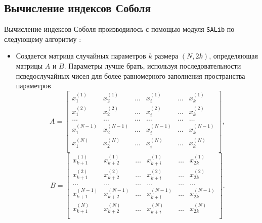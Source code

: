 \documentclass[a4paper,12pt]{article} %
\begin{document}
\subsection{Вычисление индексов Соболя}
Вычисление индексов Соболя производилось с помощью модуля \texttt{SALib} \cite{Iwanaga2022, Herman2017} по следующему алгоритму \cite{saltelli2008global}:
\begin{itemize}
\item Создается матрица случайных параметров $k$ размера $(N,2k)$, определяющая матрицы $A$ и $B$. Параметры лучше брать, используя последовательности псведослучайных чисел для более равномерного заполнения пространства параметров \cite{sobol1967distribution, sobol1976uniformly}
\begin{displaymath}
A=\begin{bmatrix}
x_1^{(1)} & x_2^{(1)} & \ldots & x_i^{(1)} & \ldots & x_k^{(1)} \\
x_1^{(2)} & x_2^{(2)} & \ldots & x_i^{(2)} & \ldots & x_k^{(2)} \\
\ldots & \ldots & \ldots & \ldots & \ldots & \ldots \\
x_1^{(N-1)} & x_2^{(N-1)} & \ldots & x_i^{(N-1)} & \ldots & x_k^{(N-1)} \\
x_1^{(N)} & x_2^{(N)} & \ldots & x_i^{(N)} & \ldots & x_k^{(N)} \\
\end{bmatrix},
\end{displaymath}
\begin{displaymath}
B=\begin{bmatrix}
x_{k+1}^{(1)} & x_{k+2}^{(1)} & \ldots & x_{k+i}^{(1)} & \ldots & x_{2k}^{(1)} \\
x_{k+1}^{(2)} & x_{k+2}^{(2)} & \ldots & x_{k+i}^{(2)} & \ldots & x_{2k}^{(2)} \\
\ldots & \ldots & \ldots & \ldots & \ldots & \ldots \\
x_{k+1}^{(N-1)} & x_{k+2}^{(N-1)} & \ldots & x_{k+i}^{(N-1)} & \ldots & x_{2k}^{(N-1)} \\
x_{k+1}^{(N)} & x_{k+2}^{(N)} & \ldots & x_{k+i}^{(N)} & \ldots & x_{2k}^{(N)} \\
\end{bmatrix}.
\end{displaymath}


\end{itemize}
\end{document}

